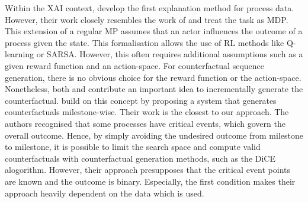 \documentclass[./../../paper.tex]{subfiles}
\begin{document}
Within the \gls{XAI} context, \citeauthor{tsirtsis_CounterfactualExplanationsSequential_2021} develop the first explanation method for process data. However, their work closely resembles the work of \citeauthor{oberst_CounterfactualOffPolicyEvaluation_2019} and treat the task as \gls{MDP}. This extension of a regular \gls{MP} assumes that an actor influences the outcome of a process given the state. This formalisation allows the use of \gls{RL} methods like Q-learning or SARSA\needscite{}. However, this often requires additional assumptions such as a given reward function and an action-space. For counterfactual sequence generation, there is no obvious choice for the reward function or the action-space. Nonetheless, both \citeauthor{tsirtsis_CounterfactualExplanationsSequential_2021} and \citeauthor{oberst_CounterfactualOffPolicyEvaluation_2019} contribute an important idea to incrementally generate the counterfactual. \citeauthor{hsieh_DiCE4ELInterpretingProcess_2021} build on this concept by proposing a system that generates counterfactuals milestone-wise. Their work is the closest to our approach. The authors recognised that some processes have critical events, which govern the overall outcome. Hence, by simply avoiding the undesired outcome from milestone to milestone, it is possible to limit the search space and compute valid counterfactuals with counterfactual generation methods, such as the DiCE alogorithm. However, their approach presupposes that the critical event points are known and the outcome is binary. Especially, the first condition makes their approach heavily dependent on the data which is used.
\end{document}
